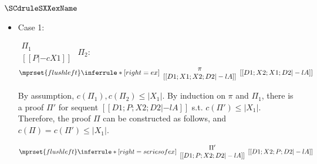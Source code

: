 \subsubsection{$\SCdruleSXXexName$}
\begin{itemize}
\item Case 1:
      \begin{center}
        \scriptsize
        \begin{math}
          \begin{array}{c}
            \Pi_1 \\
            {[[P |-c X1]]}
          \end{array}
        \end{math}
        \qquad\qquad
        $\Pi_2$:
        \begin{math}
          $$\mprset{flushleft}
          \inferrule* [right={\tiny ex}] {
            {
              \begin{array}{c}
                \pi \\
                {[[D1; X1; X2; D2 |-l A]]}
              \end{array}
            }
          }{[[D1; X2; X1; D2 |-l A]]}
        \end{math}
      \end{center}
      By assumption, $c(\Pi_1),c(\Pi_2)\leq |X_1|$. By induction on $\pi$
      and $\Pi_1$, there is a proof $\Pi'$ for sequent
      $[[D1; P; X2; D2 |-l A]]$ s.t. $c(\Pi')\leq|X_1|$. Therefore, the
      proof $\Pi$ can be constructed as follows, and
      $c(\Pi)=c(\Pi')\leq|X_1|$.
      \begin{center}
        \scriptsize
        \begin{math}
          $$\mprset{flushleft}
          \inferrule* [right={\tiny series of ex}] {
            {
              \begin{array}{c}
                \Pi' \\
                {[[D1; P; X2; D2 |-l A]]}
              \end{array}
            }
          }{[[D1; X2; P; D2 |-l A]]}
        \end{math}
      \end{center}


\end{itemize}
